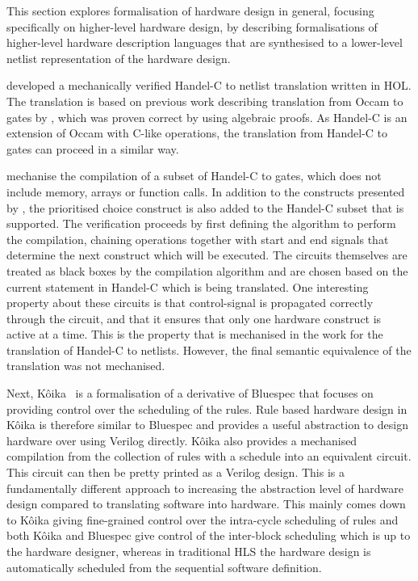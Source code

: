 This section explores formalisation of hardware design in general, focusing
specifically on higher-level hardware design, by describing formalisations of
higher-level hardware description languages that are synthesised to a
lower-level netlist representation of the hardware design.

\textcite{perna12_mechan_wire_wise_verif_handel_c_synth} developed a
mechanically verified Handel-C to netlist translation written in HOL.  The
translation is based on previous work describing translation from Occam to gates
by \textcite{page91_compil_occam}, which was proven correct by
\textcite{jifeng93_towar} using algebraic proofs.  As Handel-C is an extension
of Occam with C-like operations, the translation from Handel-C to gates can
proceed in a similar way.

\citeauthor{perna12_mechan_wire_wise_verif_handel_c_synth} mechanise the
compilation of a subset of Handel-C to gates, which does not include memory,
arrays or function calls.  In addition to the constructs presented by
\citeauthor{page91_compil_occam}, the prioritised choice construct is also added
to the Handel-C subset that is supported.  The verification proceeds by first
defining the algorithm to perform the compilation, chaining operations together
with start and end signals that determine the next construct which will be
executed.  The circuits themselves are treated as black boxes by the compilation
algorithm and are chosen based on the current statement in Handel-C which is
being translated.  One interesting property about these circuits is that
control-signal is propagated correctly through the circuit, and that it ensures
that only one hardware construct is active at a time.  This is the property that
is mechanised in the work for the translation of Handel-C to netlists.  However,
the final semantic equivalence of the translation was not mechanised.

Next, Kôika~\cite[]{bourgeat20_essen_blues} is a formalisation of a derivative
of Bluespec that focuses on providing control over the scheduling of the rules.
Rule based hardware design in Kôika is therefore similar to Bluespec and
provides a useful abstraction to design hardware over using Verilog directly.
Kôika also provides a mechanised compilation from the collection of rules with a
schedule into an equivalent circuit.  This circuit can then be pretty printed as
a Verilog design.  This is a fundamentally different approach to increasing the
abstraction level of hardware design compared to translating software into
hardware.  This mainly comes down to Kôika giving fine-grained control over the
intra-cycle scheduling of rules and both Kôika and Bluespec give control of the
inter-block scheduling which is up to the hardware designer, whereas in
traditional \gls{HLS} the hardware design is automatically scheduled from the
sequential software definition.

